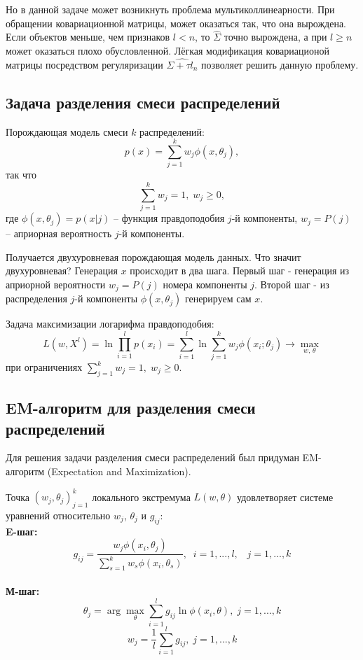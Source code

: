 Но в данной задаче может возникнуть проблема мультиколлинеарности. При обращении ковариационной матрицы, может оказаться так, что она вырождена. Если объектов меньше, чем признаков $l < n$, то $\hat{\Sigma}$ точно вырождена, а при $l \ge n$ может оказаться плохо обусловленной.
Лёгкая модификация ковариационой матрицы посредством регуляризации $\hat{\Sigma +\tau l_n}$ позволяет решить данную проблему. 

\subsection{Задача разделения смеси распределений}
Порождающая модель смеси $k$ распределений:
$$p(x) = \sum_{j=1}^k w_j \phi(x, \theta_j),$$ 
так что $$\sum_{j=1}^k w_j = 1, \; w_j \ge 0,$$
где $\phi(x,\theta_j) = p(x|j)$ -- функция правдоподобия $j$-й компоненты, $w_j = P(j)$ -- априорная вероятность $j$-й компоненты.

Получается двухуровневая порождающая модель данных. 
Что значит двухуровневая? Генерация $x$ происходит в два шага. Первый шаг - генерация из априорной вероятности $w_j = P(j)$ номера компоненты $j$. Второй шаг - из распределения $j$-й компоненты $\phi(x,\theta_j)$ генерируем сам $x$.

Задача максимизации логарифма правдоподобия:
$$L(w, X^l) = \ln \prod_{i=1}^l p(x_i) = \sum_{i=1}^l \ln \sum_{j=1}^k w_j\phi(x_i;\theta_j) \to \max_{w,\,\theta} $$ 
при ограничениях $\sum_{j=1}^k w_j = 1, \; w_j \ge 0$.

\subsection{EM-алгоритм для разделения смеси распределений}
Для решения задачи разделения смеси распределений был придуман EM-алгоритм (Expectation and Maximization). 

\begin{theorem}

Точка $(w_j, \theta_j)_{j=1}^k$ локального экстремума $L(w,\theta)$ удовлетворяет системе уравнений относительно $w_j$, $\theta_j$ и $g_{ij}$:
\\
\textbf{E-шаг: }
$$g_{ij} = \frac{w_j \phi(x_i,\theta_j)}{\sum_{s=1}^k w_s \phi(x_i, \theta_s)}, \; \; i=1,...,l, \;\;\; j = 1,...,k$$
\\
\textbf{М-шаг: }
$$\theta_j = \arg \max_\theta \sum_{i=1}^l g_{ij} \ln \phi(x_i, \theta), \; j=1,...,k $$
$$w_j = \frac{1}{l} \sum_{i=1}^l g_{ij}, \; j=1,...,k$$

\end{theorem}

